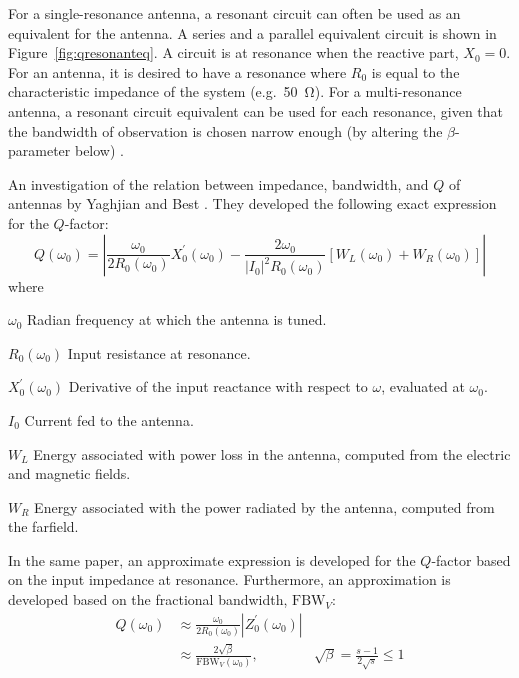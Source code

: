For a single-resonance antenna, a resonant circuit can often be used as an equivalent for the antenna. A series and a parallel equivalent circuit is shown in Figure~\ref{fig:qresonanteq}. A circuit is at resonance when the reactive part, $X_0=0$. For an antenna, it is desired to have a resonance where $R_0$ is equal to the characteristic impedance of the system (e.g.\ \SI{50}{\ohm}). For a multi-resonance antenna, a resonant circuit equivalent can be used for each resonance, given that the bandwidth of observation is chosen narrow enough (by altering the $\beta$-parameter below) \cite{yaghjian2005impedance}.

An investigation of the relation between impedance, bandwidth, and $Q$ of antennas by Yaghjian and Best \cite{yaghjian2005impedance}. They developed the following exact expression for the $Q$-factor:
\begin{equation}%
    Q(\omega_0) = \left| 
    \frac{\omega_0}{2R_0(\omega_0)}X_0^{\prime}(\omega_0)
    -
    \frac{2\omega_0}{|I_0|^2 R_0(\omega_0)} [W_L(\omega_0) + W_R(\omega_0)]
    \right|
\end{equation}
where
\begin{where}
\item[$\omega_0$] Radian frequency at which the antenna is tuned.
\item[$R_0(\omega_0)$] Input resistance at resonance.
\item[$X^{\prime}_0(\omega_0)$] Derivative of the input reactance with respect to $\omega$, evaluated at $\omega_0$.
\item[$I_0$] Current fed to the antenna.
\item[$W_L$] Energy associated with power loss in the antenna, computed from the electric and magnetic fields.
\item[$W_R$] Energy associated with the power radiated by the antenna, computed from the farfield.
\end{where}
In the same paper, an approximate expression is developed for the $Q$-factor based on the input impedance at resonance. Furthermore, an approximation is developed based on the fractional bandwidth, $\text{FBW}_V$:
\begin{align}%
    Q(\omega_0) 
    \label{eq:qapprox1}
    &\approx \frac{\omega_0}{2R_0(\omega_0)} |Z_0^{\prime}(\omega_0)| \\
    \label{eq:qapprox2}
    &\approx \frac{2\sqrt{\beta}}{\text{FBW}_V(\omega_0)}, & \sqrt{\beta} = \frac{s-1}{2\sqrt{s}} \leq 1
\end{align}
